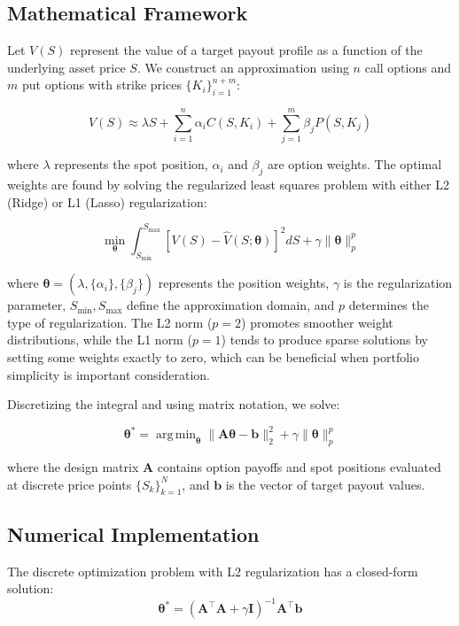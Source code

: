 \documentclass[12pt]{article}
\DeclareMathOperator*{\argmin}{arg\,min}
\begin{document}
\subsection{Mathematical Framework}
Let \( V(S) \) represent the value of a target payout profile as a function of the 
underlying asset price \( S \). We construct an approximation using \( n \) call 
options and \( m \) put options with strike prices \( \{K_i\}_{i=1}^{n+m} \):

\begin{equation}
V(S) \approx \lambda S + 
    \sum_{i=1}^{n} \alpha_i C(S, K_i) + 
    \sum_{j=1}^{m} \beta_j P(S, K_j)
\end{equation}

where \( \lambda \) represents the spot position, \( \alpha_i \) and \( \beta_j \) 
are option weights. The optimal weights are found by solving the regularized least 
squares problem with either L2 (Ridge) or L1 (Lasso) regularization:

\begin{equation}
\min_{\boldsymbol{\theta}} 
    \int_{S_{\min}}^{S_{\max}} 
        \left[ V(S) - \hat{V}(S;\boldsymbol{\theta}) \right]^2 dS + 
    \gamma \|\boldsymbol{\theta}\|_p^p
\end{equation}

where \( \boldsymbol{\theta} = (\lambda, \{\alpha_i\}, \{\beta_j\}) \) represents
the position weights, \( \gamma \) is the regularization parameter, 
\( S_{\min}, S_{\max} \) define the approximation domain, and \( p \) determines
the type of regularization. The L2 norm (\(p=2\)) promotes smoother weight 
distributions, while the L1 norm (\(p=1\)) tends to produce sparse solutions by 
setting some weights exactly to zero, which can be beneficial when portfolio 
simplicity is important consideration.

Discretizing the integral and using matrix notation, we solve:

\begin{equation}
\boldsymbol{\theta}^* = 
    \argmin_{\boldsymbol{\theta}} 
        \|\mathbf{A}\boldsymbol{\theta} - \mathbf{b}\|_2^2 + 
        \gamma \|\boldsymbol{\theta}\|_p^p
\end{equation}

where the design matrix \( \mathbf{A} \) contains option payoffs and spot positions
evaluated at discrete price points \( \{S_k\}_{k=1}^N \), and \( \mathbf{b} \) is
the vector of target payout values.

\subsection{Numerical Implementation}
The discrete optimization problem with L2 regularization has a closed-form solution:
\begin{equation}
\boldsymbol{\theta}^* = 
    (\mathbf{A}^\top \mathbf{A} + \gamma \mathbf{I})^{-1} 
    \mathbf{A}^\top \mathbf{b}
\end{equation}
\end{document}
